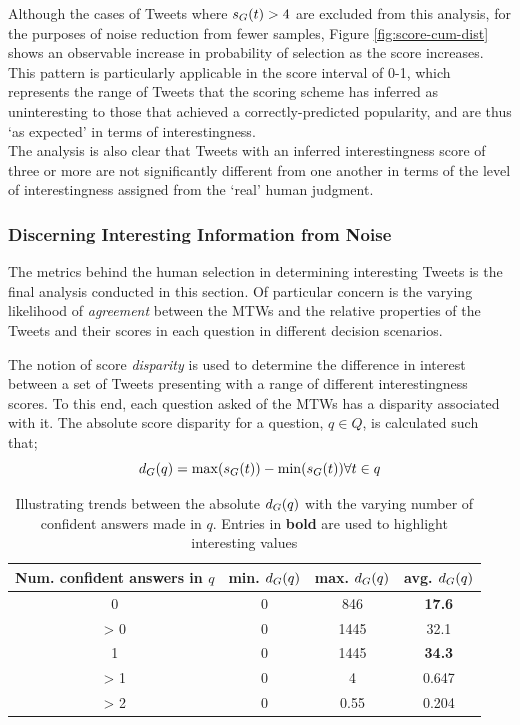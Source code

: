 Although the cases of Tweets where $s_G(t) > 4$ are excluded from this analysis, for the purposes of noise reduction from fewer samples, Figure \ref{fig:score-cum-dist} shows an observable increase in probability of selection as the score increases. This pattern is particularly applicable in the score interval of 0-1, which represents the range of Tweets that the scoring scheme has inferred as uninteresting to those that achieved a correctly-predicted popularity, and are thus `as expected' in terms of interestingness.\\
The analysis is also clear that Tweets with an inferred interestingness score of three or more are not significantly different from one another in terms of the level of interestingness assigned from the `real' human judgment.


\subsubsection{Discerning Interesting Information from Noise}
The metrics behind the human selection in determining interesting Tweets is the final analysis conducted in this section. Of particular concern is the varying likelihood of \textit{agreement} between the MTWs and the relative properties of the Tweets and their scores in each question in different decision scenarios.

The notion of score \textit{disparity} is used to determine the difference in interest between a set of Tweets presenting with a range of different interestingness scores. To this end, each question asked of the MTWs has a disparity associated with it. The absolute score disparity for a question, $q \in Q$, is calculated such that;
\[
    d_G(q) = \max(s_G(t)) - \min(s_G(t)) \forall t \in q
\]

\begin{table}[h]\footnotesize
\centering
\begin{tabular}{ c | c | c | c }
	 Num. confident answers in $q$ & min. $d_G(q)$ & max. $d_G(q)$ & avg. $d_G(q)$ \\
	 \hline
     \hline
	0 & 0 & 846 & \textbf{17.6} \\
	> 0 & 0 & 1445 & 32.1 \\
	1 & 0 & 1445 & \textbf{34.3} \\
	> 1 & 0 & 4 & 0.647 \\
	> 2 & 0 & 0.55 & 0.204\\
     \hline
\end{tabular}
\caption{Illustrating trends between the absolute $d_G(q)$ with the varying number of confident answers made in $q$. Entries in \textbf{bold} are used to highlight interesting values}
\label{table:score_disparities}
\end{table}

